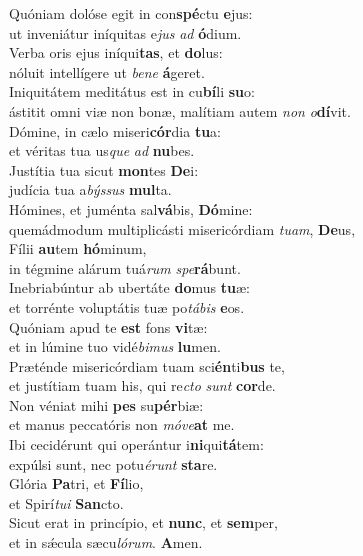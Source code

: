 \evenverse Quóniam dolóse egit in con\textbf{spé}ctu \textbf{e}jus:~\*\\
\evenverse ut inveniátur iníquitas e\textit{jus} \textit{ad} \textbf{ó}dium.\\
\oddverse Verba oris ejus iníqui\textbf{tas}, et \textbf{do}lus:~\*\\
\oddverse nóluit intellígere ut \textit{be}\textit{ne} \textbf{á}geret.\\
\evenverse Iniquitátem meditátus est in cu\textbf{bí}li \textbf{su}o:~\*\\
\evenverse ástitit omni viæ non bonæ, malítiam autem \textit{non} \textit{o}\textbf{dí}vit.\\
\oddverse Dómine, in cælo miseri\textbf{cór}dia \textbf{tu}a:~\*\\
\oddverse et véritas tua us\textit{que} \textit{ad} \textbf{nu}bes.\\
\evenverse Justítia tua sicut \textbf{mon}tes \textbf{De}i:~\*\\
\evenverse judícia tua a\textit{býs}\textit{sus} \textbf{mul}ta.\\
\oddverse Hómines, et juménta sal\textbf{vá}bis, \textbf{Dó}mine:~\*\\
\oddverse quemádmodum multiplicásti misericórdiam \textit{tu}\textit{am}, \textbf{De}us,\\
\evenverse Fílii \textbf{au}tem \textbf{hó}minum,~\*\\
\evenverse in tégmine alárum tuá\textit{rum} \textit{spe}\textbf{rá}bunt.\\
\oddverse Inebriabúntur ab ubertáte \textbf{do}mus \textbf{tu}æ:~\*\\
\oddverse et torrénte voluptátis tuæ po\textit{tá}\textit{bis} \textbf{e}os.\\
\evenverse Quóniam apud te \textbf{est} fons \textbf{vi}tæ:~\*\\
\evenverse et in lúmine tuo vidé\textit{bi}\textit{mus} \textbf{lu}men.\\
\oddverse Præténde misericórdiam tuam sci\textbf{én}ti\textbf{bus} te,~\*\\
\oddverse et justítiam tuam his, qui re\textit{cto} \textit{sunt} \textbf{cor}de.\\
\evenverse Non véniat mihi \textbf{pes} su\textbf{pér}biæ:~\*\\
\evenverse et manus peccatóris non \textit{mó}\textit{ve}\textbf{at} me.\\
\oddverse Ibi cecidérunt qui operántur i\textbf{ni}qui\textbf{tá}tem:~\*\\
\oddverse expúlsi sunt, nec potu\textit{é}\textit{runt} \textbf{sta}re.\\
\evenverse Glória \textbf{Pa}tri, et \textbf{Fí}lio,~\*\\
\evenverse et Spirí\textit{tu}\textit{i} \textbf{San}cto.\\
\oddverse Sicut erat in princípio, et \textbf{nunc}, et \textbf{sem}per,~\*\\
\oddverse et in sǽcula sæcu\textit{ló}\textit{rum}. \textbf{A}men.\\
